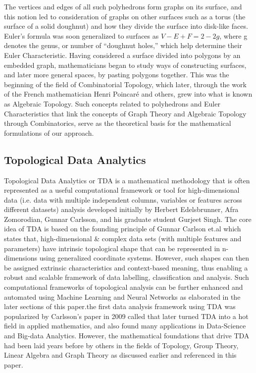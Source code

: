 The vertices and edges of all such polyhedrons form graphs on its surface, and this notion led to consideration of graphs on other surfaces such as a torus (the surface of a solid doughnut) and how they divide the surface into disk-like faces. Euler’s formula was soon generalized to surfaces as $V-E+F=2-2g$, where g denotes the genus, or number of “doughnut holes,” which help determine their Euler Characteristic. \cite{01.18_EulerFormula} Having considered a surface divided into polygons by an embedded graph, mathematicians began to study ways of constructing surfaces, and later more general spaces, by pasting polygons together. This was the beginning of the field of Combinatorial Topology, which later, through the work of the French mathematician Henri Poincaré and others, grew into what is known as Algebraic Topology.  \cite{01.1_1stCourse2018algebraicTopo} \cite{01.11_1999historyofTopo} \cite{01.12_2013TopoHistHandbook}Such concepts related to polyhedrons and Euler Characteristics that link the concepts of Graph Theory and Algebraic Topology through Combinatorics, serve as the theoretical basis for the mathematical formulations of our approach.

\subsection{Topological Data Analytics}

Topological Data Analytics or TDA \cite{02.3_2017introductionTDA} \cite{01_GCarlssonEpstein2011} is a mathematical methodology that is often represented as a useful computational framework or tool for high-dimensional data (i.e. data with multiple independent columns, variables or features across different datasets) analysis developed initially by Herbert Edelsbrunner, Afra Zomorodian, Gunnar Carlsson, and his graduate student Gurjeet Singh.\cite{01.9_2007MapperPBG} \cite{02.1_GCarlson2004topoEstimation} \cite{01_GCarlssonEpstein2011}The core idea of TDA  is based on the founding principle of Gunnar Carlson et.al\cite{02.4_TDAResearch} which states that, high-dimensional \& complex data sets (with multiple features and parameters) have intrinsic topological shape that can be represented in n-dimensions using generalized coordinate systems.\cite{01_GCarlssonEpstein2011} However, such shapes can then be assigned extrinsic characteristics and context-based meaning, thus enabling a robust and scalable framework of data labelling, classification and analysis. Such computational frameworks of topological analysis can be further enhanced and automated using Machine Learning and Neural Networks as elaborated in the later sections of this paper.the first data analysis framework using TDA was popularized by Carlsson’s paper in 2009  called  \cite{02_carlsson2009topology} that later turned TDA into a hot field in applied mathematics, and also found many applications in Data-Science and Big-data Analytics.\cite{02.6_2009TDAChallenges}\cite{18.2_2018TDAonBigData} \cite{17.1_2012foundationsTGT} However, the mathematical foundations that drive TDA had been laid years before by others in the fields of Topology, Group Theory, Linear Algebra and Graph Theory as discussed earlier and referenced in this paper.


